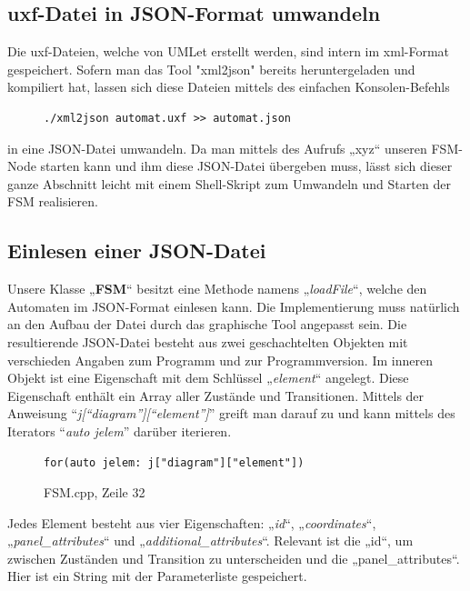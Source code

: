 \subsection{uxf-Datei in JSON-Format umwandeln}
Die uxf-Dateien, welche von UMLet erstellt werden, sind intern im xml-Format
gespeichert. Sofern man das Tool "xml2json" bereits heruntergeladen und
kompiliert hat, lassen sich diese Dateien mittels des einfachen Konsolen-Befehls

\begin{figure}[thp]
\begin{lstlisting}[style=json]
./xml2json automat.uxf >> automat.json

\end{lstlisting}
\centering
\end{figure}

in eine JSON-Datei umwandeln.
Da man mittels des Aufrufs „xyz“ unseren FSM-Node starten kann und ihm diese
JSON-Datei übergeben muss, lässt sich dieser ganze Abschnitt leicht mit einem
Shell-Skript zum Umwandeln und Starten der FSM realisieren.


\subsection{Einlesen einer JSON-Datei}
Unsere Klasse „\textbf{FSM}“ besitzt eine Methode namens „\textit{loadFile}“, welche den Automaten
im JSON-Format einlesen kann. Die Implementierung muss natürlich an den Aufbau
der Datei durch das graphische Tool angepasst sein. Die resultierende
JSON-Datei besteht aus zwei geschachtelten Objekten mit verschieden Angaben zum
Programm und zur Programmversion. Im inneren Objekt ist eine Eigenschaft mit dem
Schlüssel „\textit{element}“ angelegt. Diese Eigenschaft enthält ein Array aller Zustände
und Transitionen.
Mittels der Anweisung "`\textit{j["`diagram"']["`element"']}"' greift man
darauf zu und kann mittels des Iterators "`\textit{auto jelem}"' darüber iterieren.

\begin{figure}[thp]
\begin{lstlisting}[style=json]
for(auto jelem: j["diagram"]["element"])

\end{lstlisting}
\centering
\caption{FSM.cpp, Zeile 32}
\end{figure}

Jedes Element besteht aus vier Eigenschaften: „\textit{id}“, „\textit{coordinates}“,
„\textit{panel\_attributes}“ und „\textit{additional\_attributes}“. Relevant ist die „id“, um
zwischen Zuständen und Transition zu unterscheiden und die „panel\_attributes“.
Hier ist ein String mit der Parameterliste gespeichert.

